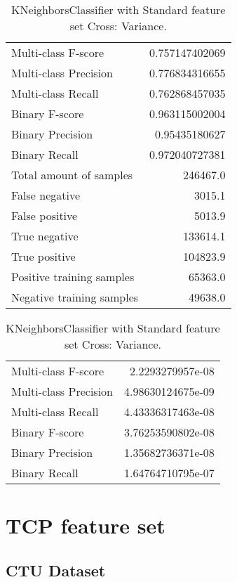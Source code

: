 \begin{table}[H]
\begin{minipage}{0.5\textwidth}
\caption{KNeighborsClassifier with Standard feature set Cross: Average.}
\centering
\begin{tabular}{l r}
\toprule
Multi-class F-score & 0.757147402069 \\
Multi-class Precision & 0.776834316655 \\
Multi-class Recall & 0.762868457035 \\
\midrule
Binary F-score & 0.963115002004 \\
Binary Precision & 0.95435180627 \\
Binary Recall & 0.972040727381 \\
\midrule
Total amount of samples & 246467.0 \\
False negative & 3015.1 \\
False positive & 5013.9 \\
True negative & 133614.1 \\
True positive & 104823.9 \\
\midrule
Positive training samples & 65363.0 \\
Negative training samples & 49638.0 \\
\bottomrule
\end{tabular}
\end{minipage}
\hfillx
\begin{minipage}{0.5\textwidth}
\caption{KNeighborsClassifier with Standard feature set Cross: Variance.}
\centering
\begin{tabular}{l r}
\toprule
Multi-class F-score & 2.2293279957e-08 \\
Multi-class Precision & 4.98630124675e-09 \\
Multi-class Recall & 4.43336317463e-08 \\
\midrule
Binary F-score & 3.76253590802e-08 \\
Binary Precision & 1.35682736371e-08 \\
Binary Recall & 1.64764710795e-07 \\
\bottomrule
\end{tabular}
\end{minipage}
\end{table}

\newpage
\section{TCP feature set}
\subsection{CTU Dataset}

